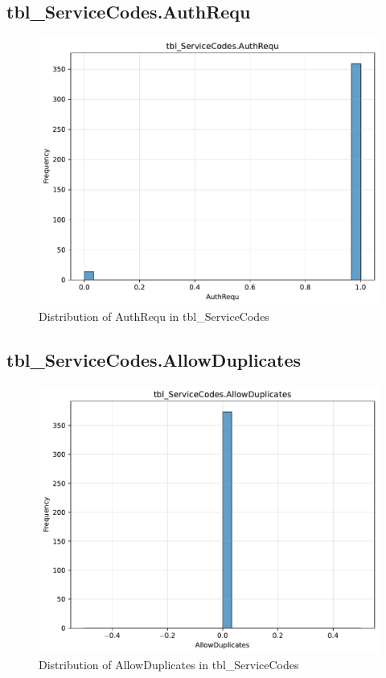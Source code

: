 \subsection{tbl\_ServiceCodes.AuthRequ}

\begin{figure}[htbp]
\centering
\includegraphics[width=\textwidth]{figures/dbo_tbl_ServiceCodes_AuthRequ.pdf}
\caption{Distribution of AuthRequ in tbl\_ServiceCodes}
\end{figure}\newpage

\subsection{tbl\_ServiceCodes.AllowDuplicates}

\begin{figure}[htbp]
\centering
\includegraphics[width=\textwidth]{figures/dbo_tbl_ServiceCodes_AllowDuplicates.pdf}
\caption{Distribution of AllowDuplicates in tbl\_ServiceCodes}
\end{figure}\newpage


